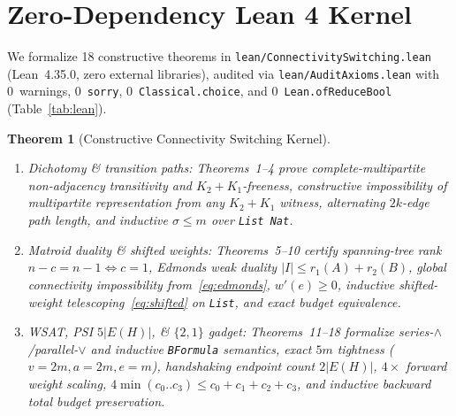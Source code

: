 \documentclass[11pt,twocolumn]{article}
\newtheorem{theorem}{Theorem}
\begin{document}
\section{Zero-Dependency Lean 4 Kernel}\label{sec:lean}
We formalize 18 constructive theorems in \texttt{lean/ConnectivitySwitching.lean} (Lean~4.35.0, zero external libraries), audited via \texttt{lean/AuditAxioms.lean} with 0~warnings, 0~\texttt{sorry}, 0~\texttt{Classical.choice}, and 0~\texttt{Lean.ofReduceBool} (Table~\ref{tab:lean}).

\begin{theorem}[Constructive Connectivity Switching Kernel]\label{thm:lean}
\leavevmode
\begin{enumerate}[leftmargin=*,nosep]
  \item \emph{Dichotomy \& transition paths:} Theorems~1--4 prove complete-multipartite non-adjacency transitivity and $K_2{+}K_1$-freeness, constructive impossibility of multipartite representation from any $K_2{+}K_1$ witness, alternating $2k$-edge path length, and inductive $\sigma \le m$ over \texttt{List Nat}.
  \item \emph{Matroid duality \& shifted weights:} Theorems~5--10 certify spanning-tree rank $n-c=n-1 \iff c=1$, Edmonds weak duality $|I| \le r_1(A)+r_2(B)$, global connectivity impossibility from~\eqref{eq:edmonds}, $w'(e) \ge 0$, inductive shifted-weight telescoping~\eqref{eq:shifted} on \texttt{List}, and exact budget equivalence.
  \item \emph{WSAT, PSI $5|E(H)|$, \& $\{2,1\}$ gadget:} Theorems~11--18 formalize series-$\land$/parallel-$\lor$ and inductive \texttt{BFormula} semantics, exact $5m$ tightness ($v=2m, a=2m, e=m$), handshaking endpoint count $2|E(H)|$, $4\times$ forward weight scaling, $4\min(c_0..c_3) \le c_0+c_1+c_2+c_3$, and inductive backward total budget preservation.
\end{enumerate}
\end{theorem}
\end{document}

